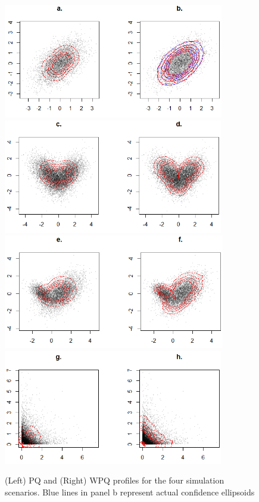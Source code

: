 \documentclass[10pt]{article}
\begin{document}
\begin{figure}[t]
	\centering
		\includegraphics[height=5cm]{Sim_bvn.png}\\
		\includegraphics[height=5cm]{Sim_mixsym.png}\\
		\includegraphics[height=5cm]{Sim_mixasym.png}\\
		\includegraphics[height=5cm]{Sim_exp2.png}
	\label{fig:fig1}
	\caption{(Left) PQ and (Right) WPQ profiles for the four simulation scenarios. Blue lines in panel b represent actual confidence ellipsoids}
\end{figure}
\end{document}
